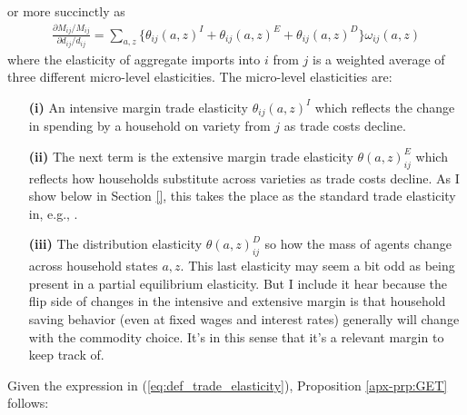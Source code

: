 \documentclass[12pt,pdftex]{article}
\begin{document}
\begin{onehalfspacing}
or more succinctly as
\begin{align}
\frac{\partial  M_{ij} / M_{ij}}{\partial d_{ij} / d_{ij}} = \sum_{a,z} \bigg \{ \theta_{ij}(a,z)^{I} + \theta_{ij}(a,z)^{E} + \theta_{ij}(a,z)^{D} \bigg \}\omega_{ij}(a,z)
\end{align}
where the elasticity of aggregate imports into $i$ from $j$ is a weighted average of three different micro-level elasticities. The micro-level elasticities are:
\begin{itemize}
\item[\textbf{(i)}] An intensive margin trade elasticity $\theta_{ij}(a,z)^{I}$ which reflects the change in spending by a household on variety from $j$ as trade costs decline.

\item[\textbf{(ii)}]  The next term is the extensive margin trade elasticity $\theta(a,z)_{ij}^{E}$ which reflects how households substitute across varieties as trade costs decline. As I show below in Section \ref{}, this takes the place as the standard trade elasticity in, e.g., \citet{eaton2002technology}.

\item[\textbf{(iii)}] The distribution elasticity $\theta(a,z)_{ij}^{D}$ so how the mass of agents change across household states $a,z$. This last elasticity may seem a bit odd as being present in a partial equilibrium elasticity. But I include it hear because the flip side of changes in the intensive and extensive margin is that household saving behavior (even at fixed wages and interest rates) generally will change with the commodity choice. It's in this sense that it's a relevant margin to keep track of.
\end{itemize}

Given the expression in (\ref{eq:def_trade_elasticity}), Proposition \ref{apx-prp:GET} follows:


\end{onehalfspacing}
\end{document}
